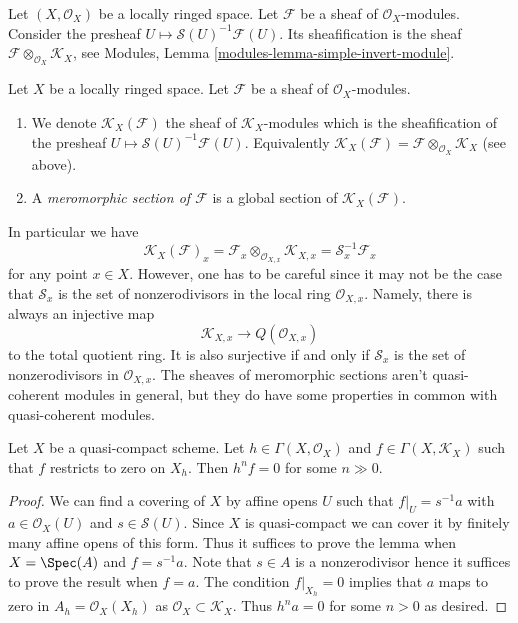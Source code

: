 \noindent
Let $(X, \mathcal{O}_X)$ be a locally ringed space.
Let $\mathcal{F}$ be a sheaf of $\mathcal{O}_X$-modules.
Consider the presheaf $U \mapsto \mathcal{S}(U)^{-1}\mathcal{F}(U)$.
Its sheafification is the sheaf
$\mathcal{F} \otimes_{\mathcal{O}_X} \mathcal{K}_X$, see
Modules, Lemma \ref{modules-lemma-simple-invert-module}.

\begin{definition}
\label{definition-meromorphic-section}
Let $X$ be a locally ringed space.
Let $\mathcal{F}$ be a sheaf of $\mathcal{O}_X$-modules.
\begin{enumerate}
\item We denote
$\mathcal{K}_X(\mathcal{F})$
the sheaf of $\mathcal{K}_X$-modules which is
the sheafification of the presheaf
$U \mapsto \mathcal{S}(U)^{-1}\mathcal{F}(U)$. Equivalently
$\mathcal{K}_X(\mathcal{F}) =
\mathcal{F} \otimes_{\mathcal{O}_X} \mathcal{K}_X$ (see above).
\item A {\it meromorphic section of $\mathcal{F}$}
is a global section of $\mathcal{K}_X(\mathcal{F})$.
\end{enumerate}
\end{definition}

\noindent
In particular we have
$$
\mathcal{K}_X(\mathcal{F})_x
=
\mathcal{F}_x \otimes_{\mathcal{O}_{X, x}} \mathcal{K}_{X, x}
=
\mathcal{S}_x^{-1}\mathcal{F}_x
$$
for any point $x \in X$. However, one has to be careful since it may
not be the case that $\mathcal{S}_x$ is the set of nonzerodivisors
in the local ring $\mathcal{O}_{X, x}$. Namely, there is always
an injective map
$$
\mathcal{K}_{X, x} \longrightarrow Q(\mathcal{O}_{X, x})
$$
to the total quotient ring. It is also surjective if and only if
$\mathcal{S}_x$ is the set of nonzerodivisors in $\mathcal{O}_{X, x}$.
The sheaves of meromorphic sections aren't quasi-coherent
modules in general, but they do have some properties in common
with quasi-coherent modules.

\begin{lemma}
\label{lemma-meromorphic-section-restricts-to-zero}
Let $X$ be a quasi-compact scheme. Let $h \in \Gamma(X, \mathcal{O}_X)$ and
$f \in \Gamma(X, \mathcal{K}_X)$ such that $f$ restricts
to zero on $X_h$. Then $h^n f = 0$ for some $n \gg 0$.
\end{lemma}

\begin{proof}
We can find a covering of $X$ by affine opens $U$ such that $f|_U = s^{-1}a$
with $a \in \mathcal{O}_X(U)$ and $s \in \mathcal{S}(U)$. Since $X$ is
quasi-compact we can cover it by finitely many affine opens of this form.
Thus it suffices to prove the lemma when $X = \Spec(A)$ and $f = s^{-1}a$.
Note that $s \in A$ is a nonzerodivisor hence it suffices to prove
the result when $f = a$. The condition $f|_{X_h} = 0$ implies that
$a$ maps to zero in $A_h = \mathcal{O}_X(X_h)$ as
$\mathcal{O}_X \subset \mathcal{K}_X$. Thus $h^na = 0$ for some $n > 0$
as desired.
\end{proof}


